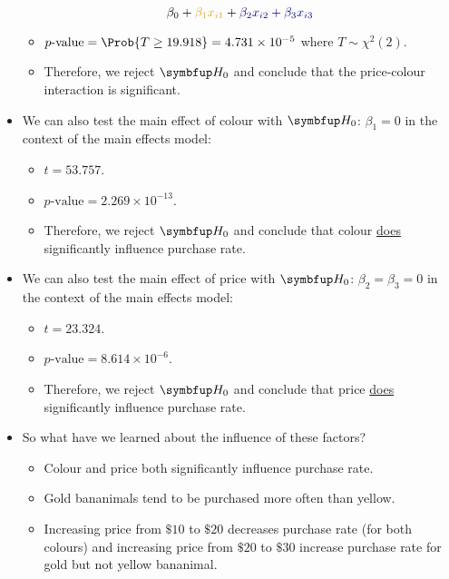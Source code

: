 \begin{itemize}
            \[ \beta_0+{\color{Goldenrod}\beta_1x_{i1}}+{\color{DarkBlue}\beta_2x_{i2}+\beta_3x_{i3}} \]
            \begin{itemize}
                  \item $ p\text{-value}=\Prob{T\ge 19.918}=4.731\times 10^{-5} $ where $ T \sim \chi^2(2) $.
                  \item Therefore, we reject $ \HN $ and conclude that the price-colour interaction is significant.
            \end{itemize}
      \item We can also test the main effect of colour with {\color{Goldenrod}$ \HN $: $ \beta_1=0 $} in the context of the main effects model:
            \begin{itemize}
                  \item $ t=53.757 $.
                  \item $ p\text{-value}=2.269\times 10^{-13} $.
                  \item Therefore, we reject $ \HN $ and conclude that colour \underline{does} significantly influence purchase rate.
            \end{itemize}
      \item We can also test the main effect of price with {\color{DarkBlue}$ \HN $: $ \beta_2=\beta_3=0 $} in the context of the main effects model:
            \begin{itemize}
                  \item $ t=23.324 $.
                  \item $ p\text{-value}=8.614\times 10^{-6} $.
                  \item Therefore, we reject $ \HN $ and conclude that price \underline{does} significantly influence purchase rate.
            \end{itemize}
      \item So what have we learned about the influence of these factors?
            \begin{itemize}
                  \item Colour and price both significantly influence purchase rate.
                  \item Gold bananimals tend to be purchased more often than yellow.
                  \item Increasing price from $ \$10 $ to $ \$20 $ decreases purchase rate (for both colours)
                        and increasing price from $ \$20 $ to $ \$30 $ increase purchase rate for gold but not yellow bananimal.

\end{itemize}
\end{itemize}
